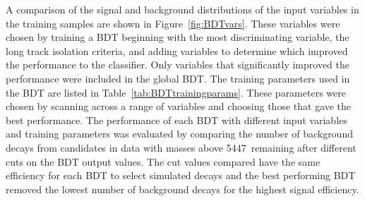 A comparison of the signal and background distributions of the input variables in the training samples are shown in Figure~\ref{fig:BDTvars}. These variables were chosen by training a BDT beginning with the most discriminating variable, the long track isolation criteria, and adding variables to determine which improved the performance to the classifier. Only variables that significantly improved the performance were included in the global BDT. The training parameters used in the BDT are listed in Table~\ref{tab:BDTtrainingparams}. These parameters were chosen by scanning across a range of variables and choosing those that gave the best performance. 
The performance of each BDT with different input variables and training parameters was evaluated by comparing the number of background decays from \bmumu candidates in data with masses above 5447~\mevcc remaining after different cuts on the BDT output values. The cut values compared have the same efficiency for each BDT to select simulated \bsmumu decays and the best performing BDT removed the lowest number of background decays for the highest signal efficiency.
